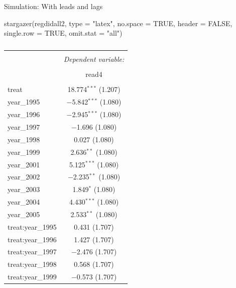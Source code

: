 \documentclass[
  ignorenonframetext,
]{beamer}
\newenvironment{Shaded}{\begin{snugshade}}{\end{snugshade}}
\newcommand{\AttributeTok}[1]{\textcolor[rgb]{0.77,0.63,0.00}{#1}}
\newcommand{\ConstantTok}[1]{\textcolor[rgb]{0.00,0.00,0.00}{#1}}
\newcommand{\FunctionTok}[1]{\textcolor[rgb]{0.00,0.00,0.00}{#1}}
\newcommand{\NormalTok}[1]{#1}
\newcommand{\StringTok}[1]{\textcolor[rgb]{0.31,0.60,0.02}{#1}}
\begin{document}
\begin{frame}[fragile]{Simulation: With leads and lags}
\protect\hypertarget{simulation-with-leads-and-lags-3}{}
\tiny

\begin{Shaded}
\begin{Highlighting}[]
\FunctionTok{stargazer}\NormalTok{(regdidall2, }\AttributeTok{type =} \StringTok{"latex"}\NormalTok{, }\AttributeTok{no.space =} \ConstantTok{TRUE}\NormalTok{, }\AttributeTok{header =} \ConstantTok{FALSE}\NormalTok{,}
    \AttributeTok{single.row =} \ConstantTok{TRUE}\NormalTok{, }\AttributeTok{omit.stat =} \StringTok{"all"}\NormalTok{)}
\end{Highlighting}
\end{Shaded}

\begin{table}[!htbp] \centering 
  \caption{} 
  \label{} 
\begin{tabular}{@{\extracolsep{5pt}}lc} 
\\[-1.8ex]\hline 
\hline \\[-1.8ex] 
 & \multicolumn{1}{c}{\textit{Dependent variable:}} \\ 
\cline{2-2} 
\\[-1.8ex] & read4 \\ 
\hline \\[-1.8ex] 
 treat & 18.774$^{***}$ (1.207) \\ 
  year\_1995 & $-$5.842$^{***}$ (1.080) \\ 
  year\_1996 & $-$2.945$^{***}$ (1.080) \\ 
  year\_1997 & $-$1.696 (1.080) \\ 
  year\_1998 & 0.027 (1.080) \\ 
  year\_1999 & 2.636$^{**}$ (1.080) \\ 
  year\_2001 & 5.125$^{***}$ (1.080) \\ 
  year\_2002 & $-$2.235$^{**}$ (1.080) \\ 
  year\_2003 & 1.849$^{*}$ (1.080) \\ 
  year\_2004 & 4.430$^{***}$ (1.080) \\ 
  year\_2005 & 2.533$^{**}$ (1.080) \\ 
  treat:year\_1995 & 0.431 (1.707) \\ 
  treat:year\_1996 & 1.427 (1.707) \\ 
  treat:year\_1997 & $-$2.476 (1.707) \\ 
  treat:year\_1998 & 0.568 (1.707) \\ 
  treat:year\_1999 & $-$0.573 (1.707) \\ 

\end{tabular}
\end{table}
\end{frame}
\end{document}
